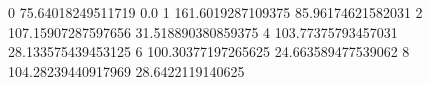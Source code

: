 0 75.64018249511719 0.0
1 161.6019287109375 85.96174621582031
2 107.15907287597656 31.518890380859375
4 103.77375793457031 28.133575439453125
6 100.30377197265625 24.663589477539062
8 104.28239440917969 28.6422119140625
